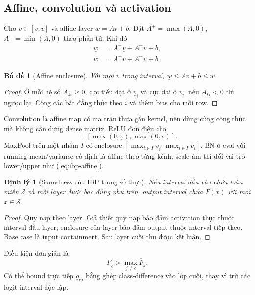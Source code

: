 \documentclass[11pt,a4paper]{article}
\newcommand{\Sset}{\mathcal S}
\newtheorem{theorem}[definition]{Định lý}
\newtheorem{lemma}[definition]{Bổ đề}
\theoremstyle{remark}
\begin{document}
\subsection{Affine, convolution và activation}
Cho $v\in[\underline v,\overline v]$ và affine layer $w=Av+b$. Đặt
$A^+=\max(A,0)$, $A^-=\min(A,0)$ theo phần tử. Khi đó
\begin{align}
 \underline w&=A^+\underline v+A^-\overline v+b,\\
 \overline w&=A^+\overline v+A^-\underline v+b.
 \label{eq:ibp-affine}
\end{align}
\begin{lemma}[Affine enclosure]
Với mọi $v$ trong interval, $\underline w\le Av+b\le\overline w$.
\end{lemma}
\begin{proof}
Ở mỗi hệ số $A_{ki}\ge0$, cực tiểu đạt ở $\underline v_i$ và cực đại ở
$\overline v_i$; nếu $A_{ki}<0$ thì ngược lại. Cộng các bất đẳng thức theo
$i$ và thêm bias cho mỗi row.
\end{proof}
Convolution là affine map có ma trận thưa gắn kernel, nên dùng cùng công
thức mà không cần dựng dense matrix. ReLU đơn điệu cho
\begin{equation}
 [\underline r,\overline r]=
 [\max(0,\underline v),\max(0,\overline v)].
\end{equation}
MaxPool trên một nhóm $I$ có enclosure
$[\max_{i\in I}\underline v_i,\max_{i\in I}\overline v_i]$.
BN ở eval với running mean/variance cố định là affine theo từng kênh,
scale âm thì đổi vai trò lower/upper như (\ref{eq:ibp-affine}).

\begin{theorem}[Soundness của IBP trong số thực]
Nếu interval đầu vào chứa toàn miền $\Sset$ và mỗi layer được bao đúng như
trên, output interval chứa $F(x)$ với mọi $x\in\Sset$.
\end{theorem}
\begin{proof}
Quy nạp theo layer. Giả thiết quy nạp bảo đảm activation thực thuộc interval
đầu layer; enclosure của layer bảo đảm output thuộc interval tiếp theo.
Base case là input containment. Sau layer cuối thu được kết luận.
\end{proof}
Điều kiện đơn giản là
\begin{equation}
 \underline F_c>\max_{j\ne c}\overline F_j.
\end{equation}
Có thể bound trực tiếp $g_{cj}$ bằng ghép class-difference vào lớp cuối,
thay vì trừ các logit interval độc lập.
\end{document}
